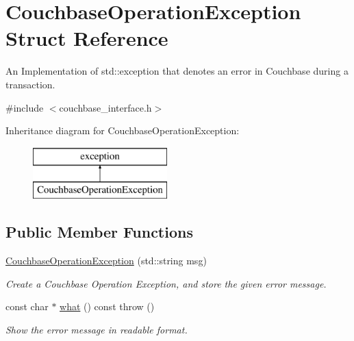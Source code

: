 \hypertarget{structCouchbaseOperationException}{\section{Couchbase\-Operation\-Exception Struct Reference}
\label{structCouchbaseOperationException}
}


An Implementation of std\-::exception that denotes an error in Couchbase during a transaction.  




{\ttfamily \#include $<$couchbase\-\_\-interface.\-h$>$}

Inheritance diagram for Couchbase\-Operation\-Exception\-:\begin{figure}[H]
\begin{center}
\leavevmode
\includegraphics[height=2.000000cm]{structCouchbaseOperationException}
\end{center}
\end{figure}
\subsection*{Public Member Functions}
\begin{DoxyCompactItemize}
\item 
\hypertarget{structCouchbaseOperationException_ae8a8b41b0ad45aa6fde99e3607a6953b}{\hyperlink{structCouchbaseOperationException_ae8a8b41b0ad45aa6fde99e3607a6953b}{Couchbase\-Operation\-Exception} (std\-::string msg)}\label{structCouchbaseOperationException_ae8a8b41b0ad45aa6fde99e3607a6953b}

\begin{DoxyCompactList}\small\item\em Create a Couchbase Operation Exception, and store the given error message. \end{DoxyCompactList}\item 
\hypertarget{structCouchbaseOperationException_af7f48b5ad89affc447e896b2e3c76a36}{const char $\ast$ \hyperlink{structCouchbaseOperationException_af7f48b5ad89affc447e896b2e3c76a36}{what} () const   throw ()}\label{structCouchbaseOperationException_af7f48b5ad89affc447e896b2e3c76a36}

\begin{DoxyCompactList}\small\item\em Show the error message in readable format. \end{DoxyCompactList}\end{DoxyCompactItemize}
